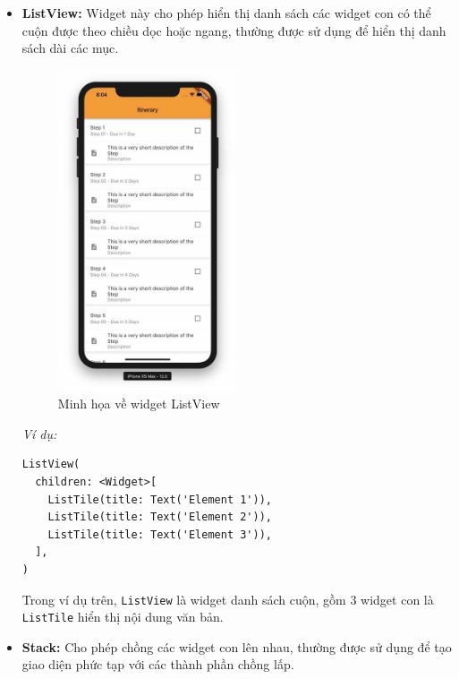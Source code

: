 \documentclass[../DoAn.tex]{subfiles}
\numberwithin{figure}{chapter}
\begin{document}
\begin{itemize}
\item \textbf{ListView:} Widget này cho phép hiển thị danh sách các widget con có thể cuộn được theo chiều dọc hoặc ngang, thường được sử dụng để hiển thị danh sách dài các mục.

\begin{figure}[H]
    \centering
    \includegraphics[width=0.5\textwidth]{Hinhve/Chuong5/listview.jpg}
    \caption{Minh họa về widget ListView}
    \label{fig:listviewwidget}
\end{figure}

\textit{Ví dụ:}

\begin{lstlisting}
ListView(
  children: <Widget>[
    ListTile(title: Text('Element 1')),
    ListTile(title: Text('Element 2')),
    ListTile(title: Text('Element 3')),
  ],
)
\end{lstlisting}


Trong ví dụ trên, \texttt{ListView} là widget danh sách cuộn, gồm 3 widget con là \texttt{ListTile} hiển thị nội dung văn bản.

\item \textbf{Stack:} Cho phép chồng các widget con lên nhau, thường được sử dụng để tạo giao diện phức tạp với các thành phần chồng lấp.


\end{itemize}
\end{document}
